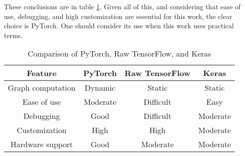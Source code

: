 These conclusions are in table \ref{tab:dl-frameworks}. Given all of this, and considering that ease of use, debugging, and high customization are essential for this work, the clear choice is PyTorch. One should consider its use when this work uses practical terms.

\begin{table}[h]
\centering
\caption{Comparison of PyTorch, Raw TensorFlow, and Keras}
\begin{tabular}{|c|c|c|c|}
\hline
\textbf{Feature} & \textbf{PyTorch} & \textbf{Raw TensorFlow} & \textbf{Keras} \\
\hline
Graph computation & Dynamic & Static & Static \\
Ease of use & Moderate & Difficult & Easy \\
Debugging & Good & Difficult & Moderate \\
Customization & High & High & Moderate \\
Hardware support & Good & Moderate & Moderate \\
\hline
\end{tabular}
\label{tab:dl-frameworks}
\end{table}
